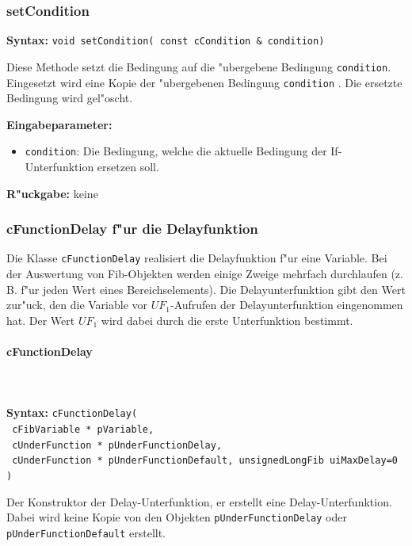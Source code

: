 \subsubsection{setCondition}

\textbf{Syntax:} \verb|void setCondition( const cCondition & condition)|

\bigskip\noindent
Diese Methode setzt die Bedingung auf die "ubergebene Bedingung \verb|condition|. Eingesetzt wird eine Kopie der "ubergebenen Bedingung \verb|condition| . Die ersetzte Bedingung wird gel"oscht.

\bigskip\noindent
\textbf{Eingabeparameter:}
\begin{itemize}
 \item \verb|condition|: Die Bedingung, welche die aktuelle Bedingung der If-Unterfunktion ersetzen soll.
\end{itemize}

\bigskip\noindent
\textbf{R"uckgabe:} keine


\subsubsection{cFunctionDelay f"ur die Delayfunktion}

Die Klasse \verb|cFunctionDelay| realisiert die Delayfunktion f"ur eine Variable. Bei der Auswertung von Fib-Objekten werden einige Zweige mehrfach durchlaufen (z. B. f"ur jeden Wert eines Bereichselements). Die Delayunterfunktion gibt den Wert zur"uck, den die Variable vor $UF_1$-Aufrufen der Delayunterfunktion eingenommen hat. Der Wert $UF_1$ wird dabei durch die erste Unterfunktion bestimmt.

\paragraph{cFunctionDelay}

\ \\\\\noindent
\textbf{Syntax:} \verb|cFunctionDelay(| \\\verb| cFibVariable * pVariable,| \\\verb| cUnderFunction * pUnderFunctionDelay,| \\\verb| cUnderFunction * pUnderFunctionDefault, unsignedLongFib uiMaxDelay=0 )|

\bigskip\noindent
Der Konstruktor der Delay-Unterfunktion, er erstellt eine Delay-Unterfunktion.
Dabei wird keine Kopie von den Objekten \verb|pUnderFunctionDelay| oder \verb|pUnderFunctionDefault| erstellt.

